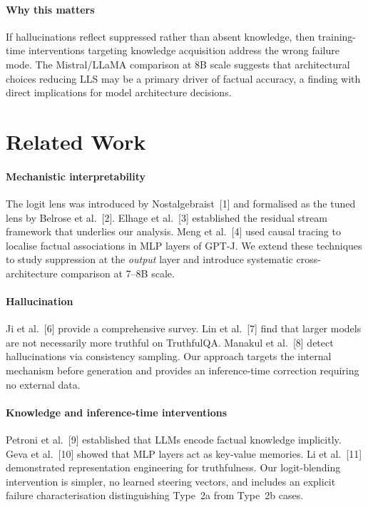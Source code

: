 \documentclass{article}
\begin{document}
\paragraph{Why this matters}
If hallucinations reflect suppressed rather than absent knowledge, then
training-time interventions targeting knowledge acquisition address the wrong
failure mode.
The Mistral/LLaMA comparison at 8B scale suggests that architectural choices
reducing LLS may be a primary driver of factual accuracy, a finding with direct
implications for model architecture decisions.

\section{Related Work}

\paragraph{Mechanistic interpretability}
The logit lens was introduced by Nostalgebraist~[1] and formalised as the tuned
lens by Belrose et al.~[2].
Elhage et al.~[3] established the residual stream framework that underlies our
analysis.
Meng et al.~[4] used causal tracing to localise factual associations in MLP
layers of GPT-J.
We extend these techniques to study suppression at the \emph{output} layer and
introduce systematic cross-architecture comparison at 7--8B scale.

\paragraph{Hallucination}
Ji et al.~[6] provide a comprehensive survey.
Lin et al.~[7] find that larger models are not necessarily more truthful on
TruthfulQA.
Manakul et al.~[8] detect hallucinations via consistency sampling.
Our approach targets the internal mechanism before generation and provides an
inference-time correction requiring no external data.

\paragraph{Knowledge and inference-time interventions}
Petroni et al.~[9] established that LLMs encode factual knowledge implicitly.
Geva et al.~[10] showed that MLP layers act as key-value memories.
Li et al.~[11] demonstrated representation engineering for truthfulness.
Our logit-blending intervention is simpler, no learned steering vectors, and
includes an explicit failure characterisation distinguishing Type~2a from
Type~2b cases.
\end{document}
